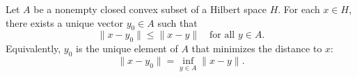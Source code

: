 Let $A$ be a nonempty closed convex subset of a Hilbert space $H$. For each $x \in H$, there exists a unique vector $y_0 \in A$ such that
$$\|x - y_0\| \leq \|x - y\| \quad \text{for all } y \in A.$$
Equivalently, $y_0$ is the unique element of $A$ that minimizes the distance to $x$:
$$\|x - y_0\| = \inf_{y \in A} \|x - y\|.$$

